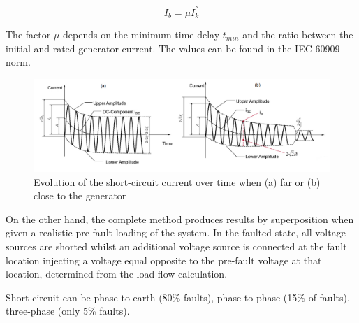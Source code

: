 \begin{equation}
    I_b = \mu I_k^{''}
    \label{eq:breakingcurrent}
\end{equation}

The factor $\mu$ depends on the minimum time delay $t_{min}$ and the ratio between the initial and rated generator current. The values can be found in the IEC 60909 norm. 

\begin{figure}[ht]
    \centering
    \includegraphics[scale=0.4]{thesis-latex/img/FarGenSC.PNG}
    \caption{Evolution of the short-circuit current over time when (a) far or (b) close to the generator %
    }
    \label{fig:reactanceneargenerator}
\end{figure}


On the other hand, the complete method produces results by superposition when given a realistic pre-fault loading of the system. In the faulted state, all voltage sources are shorted whilst an additional voltage source is connected at the fault location injecting a voltage equal opposite to the pre-fault voltage at that location, determined from the load flow calculation. %

Short circuit can be phase-to-earth (80\% faults), phase-to-phase (15\% of faults), three-phase (only 5\% faults). 



